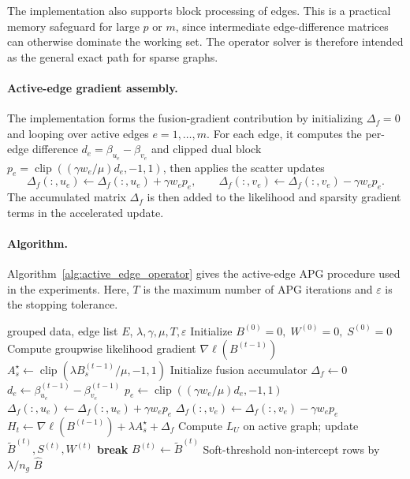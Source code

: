 \documentclass[twoside,11pt]{article}
\newcommand{\norm}[1]{\left\lVert #1 \right\rVert}
\DeclareMathOperator{\clip}{clip}
\begin{document}
The implementation also supports block processing of edges. 
This is a practical memory safeguard for large $p$ or $m$, since intermediate edge-difference matrices can otherwise dominate the working set.
The operator solver is therefore intended as the general exact path for sparse graphs.

\paragraph{Active-edge gradient assembly.}
The implementation forms the fusion-gradient contribution by initializing $\Delta_f=0$ and looping over active edges $e=1,\ldots,m$. 
For each edge, it computes the per-edge difference $d_e=\beta_{u_e}-\beta_{v_e}$ and clipped dual block $p_e=\clip((\gamma w_e/\mu)d_e,-1,1)$, then applies the scatter updates
\[
  \Delta_f(:,u_e) \leftarrow \Delta_f(:,u_e)+\gamma w_e p_e,
  \qquad
  \Delta_f(:,v_e) \leftarrow \Delta_f(:,v_e)-\gamma w_e p_e.
\]
The accumulated matrix $\Delta_f$ is then added to the likelihood and sparsity gradient terms in the accelerated update.

\paragraph{Algorithm.}
Algorithm~\ref{alg:active_edge_operator} gives the active-edge APG procedure used in the experiments. 
Here, $T$ is the maximum number of APG iterations and $\varepsilon$ is the stopping tolerance.

\begin{algorithm}[H]
\caption{Active-Edge Operator APG}
\label{alg:active_edge_operator}
\begin{algorithmic}[1]
\Require grouped data, edge list $E$, $\lambda,\gamma,\mu,T,\varepsilon$
\State Initialize $B^{(0)}=0,\;W^{(0)}=0,\;S^{(0)}=0$
  \State Compute groupwise likelihood gradient $\nabla \ell(B^{(t-1)})$
  \State $A_s^\star \gets \clip(\lambda B_s^{(t-1)}/\mu,-1,1)$
  \State Initialize fusion accumulator $\Delta_f \gets 0$
     \State $d_e \gets \beta_{u_e}^{(t-1)}-\beta_{v_e}^{(t-1)}$
     \State $p_e \gets \clip((\gamma w_e/\mu)d_e,-1,1)$
     \State $\Delta_f(:,u_e) \gets \Delta_f(:,u_e)+\gamma w_e p_e$
     \State $\Delta_f(:,v_e) \gets \Delta_f(:,v_e)-\gamma w_e p_e$
  \EndFor
  \State $H_t \gets \nabla \ell(B^{(t-1)}) + \lambda A_s^\star + \Delta_f$
  \State Compute $L_U$ on active graph; update $\tilde B^{(t)},S^{(t)},W^{(t)}$
  \If{$\norm{\tilde B^{(t)}-B^{(t-1)}}_1 < \varepsilon p$}
    \State \textbf{break}
  \EndIf
  \State $B^{(t)}\gets \tilde B^{(t)}$
\EndFor
\State Soft-threshold non-intercept rows by $\lambda/n_g$
\State \Return $\hat B$
\end{algorithmic}
\end{algorithm}
\end{document}
